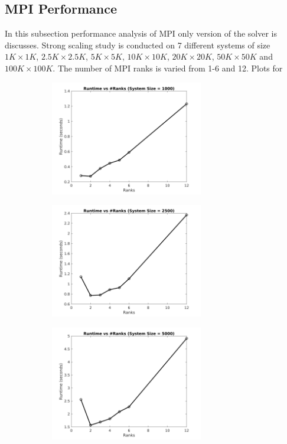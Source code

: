 \documentclass[sigplan,screen]{acmart}
\begin{document}
\subsection{MPI Performance}
In this subsection performance analysis of MPI only version of the solver is discusses. Strong scaling study is conducted on 7 different systems of size $1K\times 1K$, $2.5K\times 2.5K$, $5K\times 5K$, $10K\times 10K$, $20K\times 20K$, $50K\times 50K$ and $100K\times 100K$. The number of MPI ranks is varied from 1-6 and 12. Plots for 

\begin{figure}
	\begin{subfigure}{0.4\textwidth}
		\includegraphics[trim= 20 5 35 10,clip, width=0.95\linewidth, height=5cm]{plots/MPI_strong_1k.png} 
		\caption{}
	\end{subfigure}
	\begin{subfigure}{0.4\textwidth}
		\includegraphics[trim= 20 5 35 10,clip, width=0.95\linewidth, height=5cm]{plots/MPI_strong_2k.png}
		\caption{}
	\end{subfigure}
	\begin{subfigure}{0.4\textwidth}
		\includegraphics[trim= 20 5 35 10,clip, width=0.95\linewidth, height=5cm]{plots/MPI_strong_5k.png} 

\end{subfigure}
\end{figure}
\end{document}
